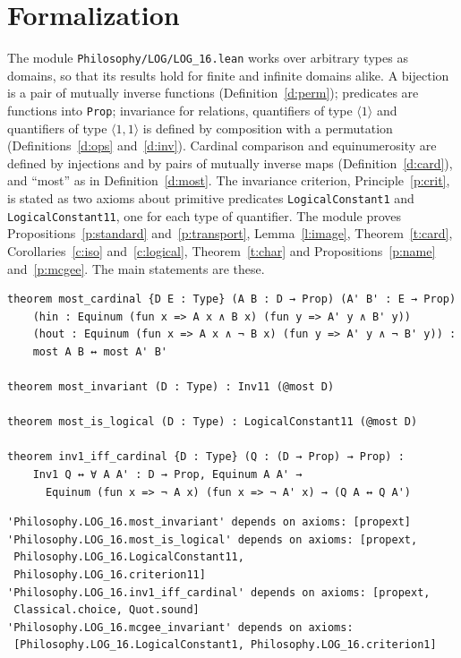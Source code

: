 \documentclass{situationist-preprint}
\begin{document}
\section{Formalization}

The module \nolinkurl{Philosophy/LOG/LOG_16.lean} works over arbitrary types as domains, so that its results hold for finite and infinite domains alike. A bijection is a pair of mutually inverse functions (Definition~\ref{d:perm}); predicates are functions into \texttt{Prop}; invariance for relations, quantifiers of type $\langle 1\rangle$ and quantifiers of type $\langle 1, 1\rangle$ is defined by composition with a permutation (Definitions~\ref{d:ops} and~\ref{d:inv}). Cardinal comparison and equinumerosity are defined by injections and by pairs of mutually inverse maps (Definition~\ref{d:card}), and \enquote{most} as in Definition~\ref{d:most}. The invariance criterion, Principle~\ref{p:crit}, is stated as two axioms about primitive predicates \texttt{LogicalConstant1} and \texttt{LogicalConstant11}, one for each type of quantifier. The module proves Propositions~\ref{p:standard} and~\ref{p:transport}, Lemma~\ref{l:image}, Theorem~\ref{t:card}, Corollaries~\ref{c:iso} and~\ref{c:logical}, Theorem~\ref{t:char} and Propositions~\ref{p:name} and~\ref{p:mcgee}. The main statements are these.

\begin{lstlisting}
theorem most_cardinal {D E : Type} (A B : D → Prop) (A' B' : E → Prop)
    (hin : Equinum (fun x => A x ∧ B x) (fun y => A' y ∧ B' y))
    (hout : Equinum (fun x => A x ∧ ¬ B x) (fun y => A' y ∧ ¬ B' y)) :
    most A B ↔ most A' B'

theorem most_invariant (D : Type) : Inv11 (@most D)

theorem most_is_logical (D : Type) : LogicalConstant11 (@most D)

theorem inv1_iff_cardinal {D : Type} (Q : (D → Prop) → Prop) :
    Inv1 Q ↔ ∀ A A' : D → Prop, Equinum A A' →
      Equinum (fun x => ¬ A x) (fun x => ¬ A' x) → (Q A ↔ Q A')
\end{lstlisting}

\begin{lstlisting}
'Philosophy.LOG_16.most_invariant' depends on axioms: [propext]
'Philosophy.LOG_16.most_is_logical' depends on axioms: [propext,
 Philosophy.LOG_16.LogicalConstant11,
 Philosophy.LOG_16.criterion11]
'Philosophy.LOG_16.inv1_iff_cardinal' depends on axioms: [propext,
 Classical.choice, Quot.sound]
'Philosophy.LOG_16.mcgee_invariant' depends on axioms:
 [Philosophy.LOG_16.LogicalConstant1, Philosophy.LOG_16.criterion1]
\end{lstlisting}
\end{document}
